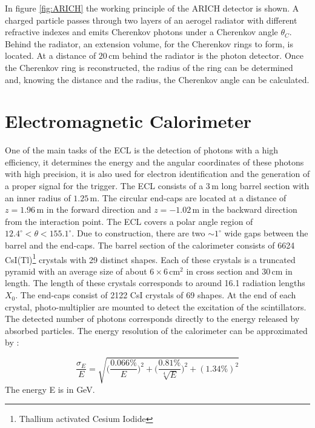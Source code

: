 \documentclass[a4paper,11pt,twosided,final,german,openbib,pdftex,listof=totoc,bibliography=totoc]{scrbook}
\begin{document}
In figure \ref{fig:ARICH} the working principle of the ARICH detector is shown. A charged particle passes through two layers of an aerogel radiator with different refractive indexes and emits Cherenkov photons under a Cherenkov angle $\theta_C$. Behind the radiator, an extension volume, for the Cherenkov rings to form, is located. At a distance of $20\,\textrm{cm}$ behind the radiator is the photon detector.\cite{B2TR} Once the Cherenkov ring is reconstructed, the radius of the ring can be determined and, knowing the distance and the radius, the Cherenkov angle can be calculated.

\section{Electromagnetic Calorimeter}
\label{sec:ECL}

One of the main tasks of the ECL is the detection of photons with a high efficiency, it determines the energy and the angular coordinates of these photons with high precision, it is also used for electron identification and the generation of a proper signal for the trigger. The ECL consists of a $3\,\textrm{m}$ long barrel section with an inner radius of $1.25\,\textrm{m}$. The circular end-caps are located at a distance of $z=1.96\,\textrm{m}$ in the forward direction and $z=-1.02\,\textrm{m}$ in the backward direction from the interaction point. The ECL covers a polar angle region of $12.4^{\circ} < \theta < 155.1^{\circ}$. Due to construction, there are two $ \sim 1^{\circ}$ wide gaps between the barrel and the end-caps. The barrel section of the calorimeter consists of 6624 CsI(Tl)\footnote{Thallium activated Cesium Iodide} crystals with 29 distinct shapes. Each of these crystals is a truncated pyramid with an average size of about $6\times6 \, \textrm{cm}^2$ in cross section and $30\,\textrm{cm}$ in length. The length of these crystals corresponds to around 16.1 radiation lengths $X_0$. The end-caps consist of 2122 CsI crystals of 69 shapes. At the end of each crystal, photo-multiplier are mounted to detect the excitation of the scintillators. The detected number of photons corresponds directly to the energy released by absorbed particles.
The energy resolution of the calorimeter can be approximated by \cite{B2TR} \cite{Belle_ECL_2015}:

\begin{equation}
\frac{\sigma_E}{E} = \sqrt{\bigg(\frac{0.066\%}{E}\bigg)^2 + \bigg(\frac{0.81\%}{\sqrt[4]{E}}\bigg)^2 + (1.34\%)^2}
\end{equation}
The energy E is in GeV.
\newline
\end{document}
